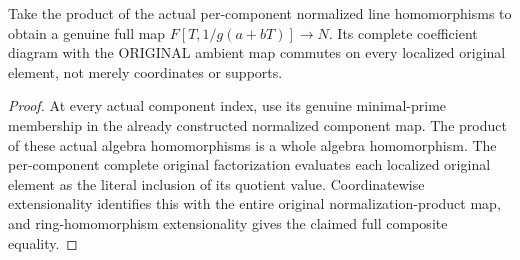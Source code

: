 \begin{definition}
\label{algebra:whole-normalized-line-product-map}
\leanok
{}
Take the product of the actual per-component normalized line homomorphisms
to obtain a genuine full map $F[T,1/g(a+bT)]\to N$. Its complete
coefficient diagram with the ORIGINAL ambient map commutes on every
localized original element, not merely coordinates or supports.
\end{definition}
\begin{proof}
At every actual component index, use its genuine minimal-prime membership
in the already constructed normalized component map. The product of
these actual algebra homomorphisms is a whole algebra homomorphism.
The per-component complete original factorization evaluates each
localized original element as the literal inclusion of its quotient
value. Coordinatewise extensionality identifies this with the entire
original normalization-product map, and ring-homomorphism extensionality
gives the claimed full composite equality.
\end{proof}

